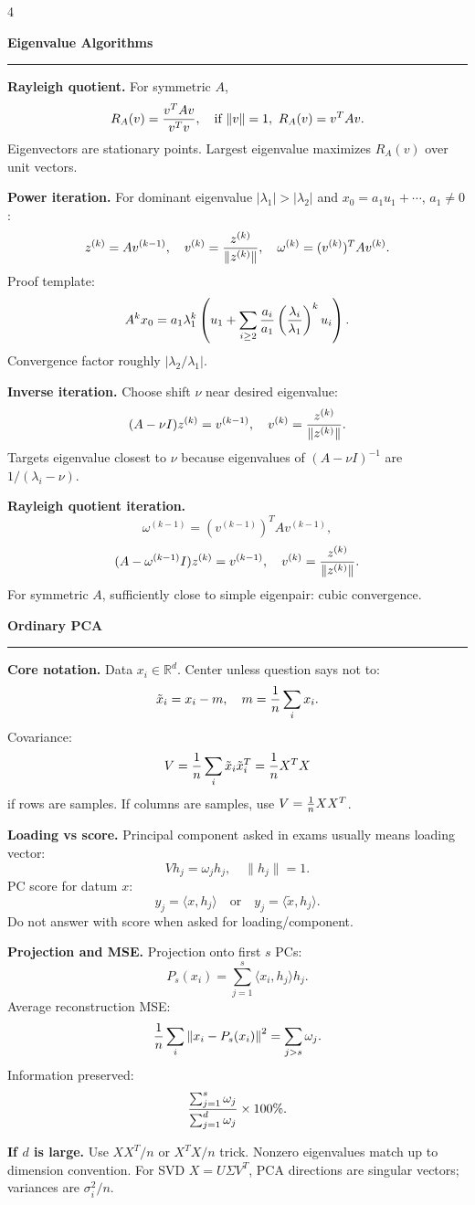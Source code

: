 \documentclass[10pt,a4paper,landscape]{article}
\newcommand{\topic}[1]{\vspace{2pt}\textbf{\large #1}\par\hrule\vspace{2pt}}
\newcommand{\subtopic}[1]{\textbf{#1.}}
\newcommand{\R}{\mathbb R}
\begin{document}
\begin{multicols*}{4}

\topic{Eigenvalue Algorithms}
\subtopic{Rayleigh quotient}
For symmetric $A$,
\[
R_A(v)={v^TAv\over v^Tv},\quad \text{if }\|v\|=1,\ R_A(v)=v^TAv.
\]
Eigenvectors are stationary points. Largest eigenvalue maximizes $R_A(v)$ over unit vectors.

\subtopic{Power iteration}
For dominant eigenvalue $|\lambda_1|>|\lambda_2|$ and $x_0=a_1u_1+\cdots$, $a_1\ne0$:
\[
z^{(k)}=Av^{(k-1)},\quad v^{(k)}={z^{(k)}\over \|z^{(k)}\|},\quad
\omega^{(k)}=(v^{(k)})^TAv^{(k)}.
\]
Proof template:
\[
A^kx_0=a_1\lambda_1^k\left(u_1+\sum_{i\ge2}{a_i\over a_1}\left({\lambda_i\over\lambda_1}\right)^ku_i\right).
\]
Convergence factor roughly $|\lambda_2/\lambda_1|$.

\subtopic{Inverse iteration}
Choose shift $\nu$ near desired eigenvalue:
\[
(A-\nu I)z^{(k)}=v^{(k-1)},\quad
v^{(k)}={z^{(k)}\over\|z^{(k)}\|}.
\]
Targets eigenvalue closest to $\nu$ because eigenvalues of $(A-\nu I)^{-1}$ are $1/(\lambda_i-\nu)$.

\subtopic{Rayleigh quotient iteration}
\[
\omega^{(k-1)}=(v^{(k-1)})^TAv^{(k-1)},
\]
\[
(A-\omega^{(k-1)}I)z^{(k)}=v^{(k-1)},\quad
v^{(k)}={z^{(k)}\over\|z^{(k)}\|}.
\]
For symmetric $A$, sufficiently close to simple eigenpair: cubic convergence.

\topic{Ordinary PCA}
\subtopic{Core notation}
Data $x_i\in\R^d$. Center unless question says not to:
\[
\tilde x_i=x_i-m,\quad m={1\over n}\sum_i x_i.
\]
Covariance:
\[
V={1\over n}\sum_i \tilde x_i\tilde x_i^T={1\over n}X^TX
\]
if rows are samples. If columns are samples, use $V={1\over n}XX^T$.

\subtopic{Loading vs score}
Principal component asked in exams usually means loading vector:
\[
Vh_j=\omega_jh_j,\quad \|h_j\|=1.
\]
PC score for datum $x$:
\[
y_j=\langle x,h_j\rangle \quad \text{or}\quad y_j=\langle \tilde x,h_j\rangle.
\]
Do not answer with score when asked for loading/component.

\subtopic{Projection and MSE}
Projection onto first $s$ PCs:
\[
P_s(x_i)=\sum_{j=1}^s\langle x_i,h_j\rangle h_j.
\]
Average reconstruction MSE:
\[
{1\over n}\sum_i\left\|x_i-P_s(x_i)\right\|^2
=\sum_{j>s}\omega_j.
\]
Information preserved:
\[
{\sum_{j=1}^s\omega_j\over \sum_{j=1}^d\omega_j}\times100\%.
\]

\subtopic{If $d$ is large}
Use $XX^T/n$ or $X^TX/n$ trick. Nonzero eigenvalues match up to dimension convention. For SVD $X=U\Sigma V^T$, PCA directions are singular vectors; variances are $\sigma_i^2/n$.


\end{multicols*}
\end{document}
